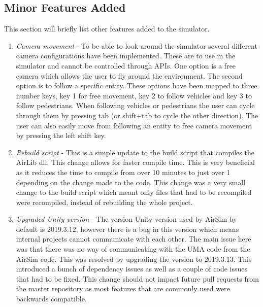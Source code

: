 \subsection{Minor Features Added}
This section will briefly list other features added to the simulator. 
\begin{enumerate}
 \item \emph{Camera movement} - To be able to look around the simulator several different camera configurations have been implemented. These are to use in the simulator and cannot be controlled through APIs. One option is a free camera which allows the user to fly around the environment. The second option is to follow a specific entity. These options have been mapped to three number keys, key 1 for free movement, key 2 to follow vehicles and key 3 to follow pedestrians. When following vehicles or pedestrians the user can cycle through them by pressing tab (or shift+tab to cycle the other direction). The user can also easily move from following an entity to free camera movement by pressing the left shift key. 
 \item \emph{Rebuild script} - This is a simple update to the build script that compiles the AirLib dll. This change allows for faster compile time. This is very beneficial as it reduces the time to compile from over 10 minutes to just over 1 depending on the change made to the code. This change was a very small change to the build script which meant only files that had to be recompiled were recompiled, instead of rebuilding the whole project. 
 \item \emph{Upgraded Unity version} - The version Unity version used by AirSim by default is 2019.3.12, however there is a bug in this version which means internal projects cannot communicate with each other. The main issue here was that there was no way of communicating with the UMA code from the AirSim code. This was resolved by upgrading the version to 2019.3.13. This introduced a bunch of dependency issues as well as a couple of code issues that had to be fixed. This change should not impact future pull requests from the master repository as most features that are commonly used were backwards compatible. 
\end{enumerate}
